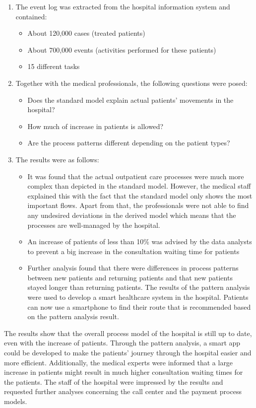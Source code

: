 \documentclass{article}
\begin{document}
\begin{enumerate}
    \item The event log was extracted from the hospital information system and contained:
    \begin{itemize}
        \item About 120,000 cases (treated patients)
        \item About 700,000 events (activities performed for these patients)
        \item 15 different tasks
    \end{itemize}
    \item Together with the medical professionals, the following questions were posed:
    \begin{itemize}
        \item Does the standard model explain actual patients' movements in the hospital?
        \item How much of increase in patients is allowed?
        \item Are the process patterns different depending on the patient types?
    \end{itemize}
    \item The results were as follows:
    \begin{itemize}
        \item It was found that the actual outpatient care processes were much more complex than depicted in the standard model. However, the medical staff explained this with the fact that the standard model only shows the most important flows. Apart from that, the professionals were not able to find any undesired deviations in the derived model which means that the processes are well-managed by the hospital.
        \item An increase of patients of less than 10\% was advised by the data analysts to prevent a big increase in the consultation waiting time for patients
        \item Further analysis found that there were differences in process patterns between new patients and returning patients and that new patients stayed longer than returning patients. The results of the pattern analysis were used to develop a smart healthcare system in the hospital. Patients can now use a smartphone to find their route that is recommended based on the pattern analysis result.
    \end{itemize}
\end{enumerate}

The results show that the overall process model of the hospital is still up to date, even with the increase of patients. Through the pattern analysis, a smart app could be developed to make the patients' journey through the hospital easier and more efficient. Additionally, the medical experts were informed that a large increase in patients might result in much higher consultation waiting times for the patients. The staff of the hospital were impressed by the results and requested further analyses concerning the call center and the payment process models.
\end{document}
